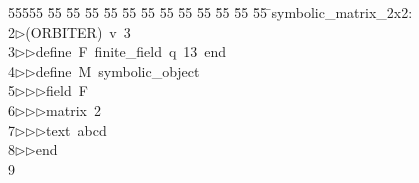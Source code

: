 %
%
\begin{tabbing}
55555 \= 55 \= 55 \= 55 \= 55 \= 55 \= 55 \= 55 \= 55 \= 55 \= 55 \= 55 \= 55 \= \>symbolic\_matrix\_2x2:\\[0pt]
2\>$\triangleright$\>(ORBITER)\ v\ 3\ \\[0pt]
3\>$\triangleright$\>$\triangleright$\>define\ F\ finite\_field\ q\ 13\ end\ \\[0pt]
4\>$\triangleright$\>$\triangleright$\>define\ M\ symbolic\_object\ \\[0pt]
5\>$\triangleright$\>$\triangleright$\>$\triangleright$\>field\ F\ \\[0pt]
6\>$\triangleright$\>$\triangleright$\>$\triangleright$\>matrix\ 2\ \\[0pt]
7\>$\triangleright$\>$\triangleright$\>$\triangleright$\>text\ abcd\ \\[0pt]
8\>$\triangleright$\>$\triangleright$\>end\\[0pt]
9\>\end{tabbing}
